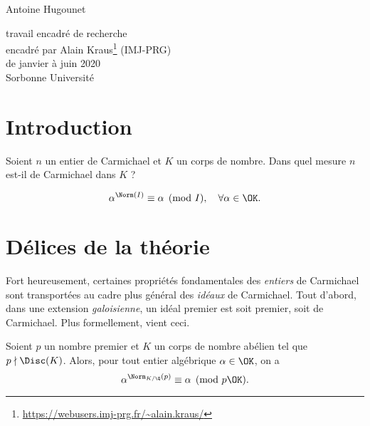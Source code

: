 \documentclass[a4paper, 12pt, oneside]{article}
\begin{document}
\begin{titlepage}
\begin{center}
	\large Antoine Hugounet \\

	\vspace{40px}
	\LARGE {}

	\vspace{40px}
	\large
	travail encadré de recherche \\
	encadré par Alain Kraus\footnote{\url{https://webusers.imj-prg.fr/~alain.kraus/}} (IMJ-PRG) \\
	de janvier à juin 2020 \\

	\vspace{20px}
	Sorbonne Université
\end{center}

\end{titlepage}

\section*{Introduction}

\begin{question}\label{question-centrale}Soient $n$ un entier de Carmichael et $K$ un corps de nombre. Dans quel mesure $n$ est-il de Carmichael dans $K$ ?
\end{question}

\begin{equation}\label{eq-Carmichael}
\alpha^{\Norm(I)} \equiv \alpha \pmod{I}, \quad \forall \alpha \in \OK.
\end{equation}

\section{Délices de la théorie}

Fort heureusement, certaines propriétés fondamentales des \emph{entiers} de Carmichael sont transportées au cadre plus général des \emph{idéaux} de Carmichael. Tout d'abord, dans une extension \emph{galoisienne}, un idéal premier est soit premier, soit de Carmichael. Plus formellement, vient ceci.
\begin{theoreme}
	Soient $p$ un nombre premier et $K$ un corps de nombre abélien tel que $p\nmid \Disc(K)$. Alors, pour tout entier algébrique $\alpha \in \OK$, on a $$\alpha^{\Norm_{K/\Q}(p)} \equiv \alpha \pmod{p\OK}.$$
\end{theoreme}
\end{document}
